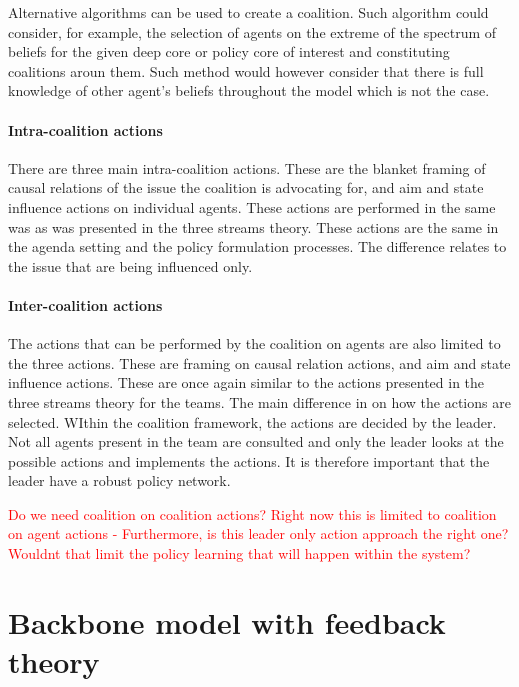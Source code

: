 Alternative algorithms can be used to create a coalition. Such algorithm could consider, for example, the selection of agents on the extreme of the spectrum of beliefs for the given deep core or policy core of interest and constituting coalitions aroun them. Such method would however consider that there is full knowledge of other agent's beliefs throughout the model which is not the case.

\paragraph{Intra-coalition actions}

There are three main intra-coalition actions. These are the blanket framing of causal relations of the issue the coalition is advocating for, and aim and state influence actions on individual agents. These actions are performed in the same was as was presented in the three streams theory. These actions are the same in the agenda setting and the policy formulation processes. The difference relates to the issue that are being influenced only.

\paragraph{Inter-coalition actions}

The actions that can be performed by the coalition on agents are also limited to the three actions. These are framing on causal relation actions, and aim and state influence actions. These are once again similar to the actions presented in the three streams theory for the teams. The main difference in on how the actions are selected. WIthin the coalition framework, the actions are decided by the leader. Not all agents present in the team are consulted and only the leader looks at the possible actions and implements the actions. It is therefore important that the leader have a robust policy network. 

\textcolor{red}{Do we need coalition on coalition actions? Right now this is limited to coalition on agent actions - Furthermore, is this leader only action approach the right one? Wouldnt that limit the policy learning that will happen within the system?}

\section{Backbone model with feedback theory}
\label{sec:modelFeedback}

